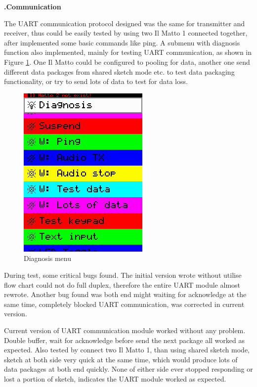 \documentclass[a4paper,notitlepage,10pt]{report}
\newcommand{\tab}{\hspace{0.75cm}}
\newcommand{\fontSubHeading}{\fontsize{10pt}{11pt}\selectfont}
\newcounter{sections}
\newcounter{subsections}[sections]
\begin{document}
\begin{multicols}{2}
\fontSubHeading
{}
\textbf{\thesections.\thesubsections\tab Communication}
\vspace{6pt}

The UART communication protocol designed was the same for transmitter and receiver, thus could be easily tested by using two Il Matto 1 connected together, after implemented some basic commands like ping. A submenu with diagnosis function also implemented, mainly for testing UART communication, as shown in Figure \ref{fig:capDiag}. One Il Matto could be configured to pooling for data, another one send different data packages from shared sketch mode etc. to test data packaging functionality, or try to send lots of data to test for data loss.

\begin{figure}[H]
	\centering
	\includegraphics[width=0.4\columnwidth]{cap_diagnosis}
	\caption{Diagnosis menu}
	\label{fig:capDiag}
\end{figure}
\vspace{6pt}

During test, some critical bugs found. The initial version wrote without utilise flow chart could not do full duplex, therefore the entire UART module almost rewrote. Another bug found was both end might waiting for acknowledge at the same time, completely blocked UART communication, was corrected in current version.
\vspace{6pt}

Current version of UART communication module worked without any problem. Double buffer, wait for acknowledge before send the next package all worked as expected. Also tested by connect two Il Matto 1, than using shared sketch mode, sketch at both side very quick at the same time, which would produce lots of data packages at both end quickly. None of either side ever stopped responding or lost a portion of sketch, indicates the UART module worked as expected.
\vspace{6pt}


\end{multicols}
\end{document}
